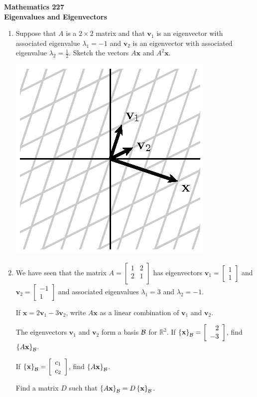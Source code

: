 \documentclass[12pt]{article}
\newcommand{\vs}[1]{\vspace{#1in}}
\newcommand{\vvec}{{\mathbf v}}
\newcommand{\xvec}{{\mathbf x}}
\newcommand{\real}{{\mathbb R}}
\newcommand{\twovec}[2]{\left[\begin{array}{r}#1 \\ #2
    \end{array}\right]}
\newcommand{\bcal}{{\cal B}}
\newcommand{\coords}[2]{\left\{#1\right\}_{#2}}
\begin{document}
\noindent
{\bf Mathematics 227} \\ 
{\bf Eigenvalues and Eigenvectors}

\bigskip
\begin{enumerate}
\item  Suppose that $A$ is a $2\times2$ matrix and that $\vvec_1$ is
  an eigenvector with associated eigenvalue $\lambda_1 = -1$ and
  $\vvec_2$ is an eigenvector with associated eigenvalue
  $\lambda_2=\frac12$.  Sketch the vectors $A\xvec$ and $A^2\xvec$.

  \medskip
  \includegraphics{26-diag.eps}

\item We have seen that the matrix
  $
  A = \left[
    \begin{array}{cc}
      1 & 2 \\
      2 & 1 \\
    \end{array}
  \right]
  $ has eigenvectors $\vvec_1=\twovec11$ and $\vvec_2=\twovec{-1}1$
  and associated eigenvalues $\lambda_1 = 3$ and $\lambda_2 = -1$.

  If $\xvec=2\vvec_1-3\vvec_2$, write $A\xvec$ as a linear combination
  of $\vvec_1$ and $\vvec_2$.

  \vs{1}
  The eigenvectors $\vvec_1$ and $\vvec_2$ form a basis $\bcal$ for
  $\real^2$.  If $\coords{\xvec}{\bcal} = \twovec{2}{-3}$, find
  $\coords{A\xvec}{\bcal}$.

  \vs{1}
  If $\coords{\xvec}{\bcal} = \twovec{c_1}{c_2}$, find
  $\coords{A\xvec}{\bcal}$.

  \vs{1}
  \newpage
  Find a matrix $D$ such that
  $\coords{A\xvec}{\bcal} = D\coords{\xvec}{\bcal}$.


\end{enumerate}
\end{document}
